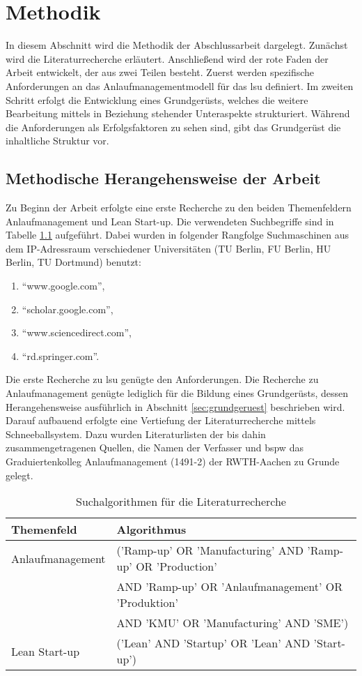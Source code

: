 \chapter{Methodik}\label{sec:methodik}
In diesem Abschnitt wird die Methodik der Abschlussarbeit dargelegt. Zunächst wird die Literaturrecherche erläutert. Anschließend wird der rote Faden der Arbeit entwickelt, der aus zwei Teilen besteht. Zuerst werden spezifische Anforderungen an das Anlaufmanagementmodell für das \gls{lsu} definiert. Im zweiten Schritt erfolgt die Entwicklung eines Grundgerüsts, welches die weitere Bearbeitung mittels in Beziehung stehender Unteraspekte strukturiert. Während die Anforderungen als Erfolgsfaktoren zu sehen sind, gibt das Grundgerüst die inhaltliche Struktur vor.  


\section{Methodische Herangehensweise der Arbeit}

Zu Beginn der Arbeit erfolgte eine erste Recherche zu den beiden Themenfeldern Anlaufmanagement und Lean Start-up. Die verwendeten Suchbegriffe sind in Tabelle \ref{tab:algorythm} aufgeführt. Dabei wurden in folgender Rangfolge Suchmaschinen aus dem IP-Adressraum verschiedener Universitäten (TU Berlin, FU Berlin, HU Berlin, TU Dortmund) benutzt: 
\begin{enumerate}
 \item ``www.google.com'',
 \item ``scholar.google.com'',
 \item ``www.sciencedirect.com'',
 \item ``rd.springer.com''.
 \end{enumerate}
 Die erste Recherche zu \gls{lsu} genügte den Anforderungen. Die Recherche zu Anlaufmanagement genügte lediglich für die Bildung eines Grundgerüsts, dessen Herangehensweise ausführlich in Abschnitt \ref{sec:grundgeruest} beschrieben wird. Darauf aufbauend erfolgte eine Vertiefung der Literaturrecherche mittels Schneeballsystem. Dazu wurden Literaturlisten der bis dahin zusammengetragenen Quellen, die Namen der Verfasser und \gls{bspw} das Graduiertenkolleg Anlaufmanagement (1491-2) der RWTH-Aachen zu Grunde gelegt. 
\begin{table}[h]
\caption{Suchalgorithmen für die Literaturrecherche} \label{tab:algorythm} 
\begin{center}
\begin{tabular}{l l}
\textbf{Themenfeld} & \textbf{Algorithmus }\\ \hline
Anlaufmanagement & ('Ramp-up' OR 'Manufacturing' AND 'Ramp-up' OR 'Production' \\ 
& AND 'Ramp-up' OR 'Anlaufmanagement' OR 'Produktion' \\
& AND 'KMU' OR 'Manufacturing' AND 'SME') \\
Lean Start-up & ('Lean' AND 'Startup' OR 'Lean' AND 'Start-up')
 \end{tabular} 
 \end{center}
\end{table}

